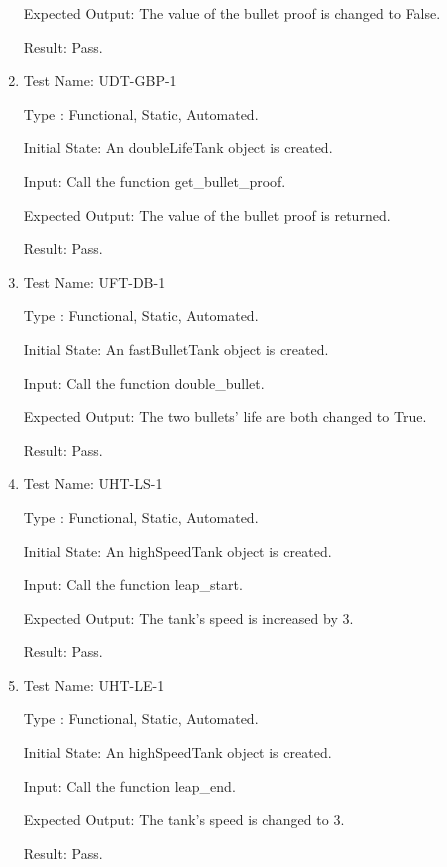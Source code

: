 \documentclass[12pt, titlepage]{article}
\begin{document}
\begin{enumerate}
Expected Output: The value of the bullet proof is changed to False.

Result: Pass.\\

\item{Test Name: UDT-GBP-1}

Type : Functional, Static, Automated.

Initial State: An doubleLifeTank object is created.

Input: Call the function get\_bullet\_proof.

Expected Output: The value of the bullet proof is returned.

Result: Pass.\\

\item{Test Name: UFT-DB-1}

Type : Functional, Static, Automated.

Initial State: An fastBulletTank object is created.

Input: Call the function double\_bullet.

Expected Output: The two bullets' life are both changed to True.

Result: Pass.\\

\item{Test Name: UHT-LS-1}

Type : Functional, Static, Automated.

Initial State: An highSpeedTank object is created.

Input: Call the function leap\_start.

Expected Output: The tank's speed is increased by 3.

Result: Pass.\\

\item{Test Name: UHT-LE-1}

Type : Functional, Static, Automated.

Initial State: An highSpeedTank object is created.

Input: Call the function leap\_end.

Expected Output: The tank's speed is changed to 3.

Result: Pass.\\
\end{enumerate}
\end{document}
